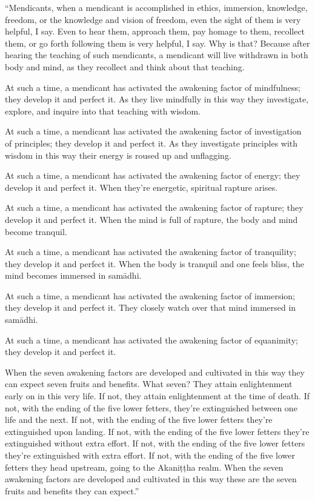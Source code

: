 \documentclass[12pt,openany]{book}%
\begin{document}
“Mendicants, when a mendicant is accomplished in ethics, immersion, knowledge, freedom, or the knowledge and vision of freedom, even the sight of them is very helpful, I say. Even to hear them, approach them, pay homage to them, recollect them, or go forth following them is very helpful, I say. Why is that? Because after hearing the teaching of such mendicants, a mendicant will live withdrawn in both body and mind, as they recollect and think about that teaching. 

At such a time, a mendicant has activated the awakening factor of mindfulness; they develop it and perfect it. As they live mindfully in this way they investigate, explore, and inquire into that teaching with wisdom. 

At such a time, a mendicant has activated the awakening factor of investigation of principles; they develop it and perfect it. As they investigate principles with wisdom in this way their energy is roused up and unflagging. 

At such a time, a mendicant has activated the awakening factor of energy; they develop it and perfect it. When they’re energetic, spiritual rapture arises. 

At such a time, a mendicant has activated the awakening factor of rapture; they develop it and perfect it. When the mind is full of rapture, the body and mind become tranquil. 

At such a time, a mendicant has activated the awakening factor of tranquility; they develop it and perfect it. When the body is tranquil and one feels bliss, the mind becomes immersed in \textsanskrit{samādhi}. 

At such a time, a mendicant has activated the awakening factor of immersion; they develop it and perfect it. They closely watch over that mind immersed in \textsanskrit{samādhi}. 

At such a time, a mendicant has activated the awakening factor of equanimity; they develop it and perfect it. 

When the seven awakening factors are developed and cultivated in this way they can expect seven fruits and benefits. What seven? They attain enlightenment early on in this very life. If not, they attain enlightenment at the time of death. If not, with the ending of the five lower fetters, they’re extinguished between one life and the next. If not, with the ending of the five lower fetters they’re extinguished upon landing. If not, with the ending of the five lower fetters they’re extinguished without extra effort. If not, with the ending of the five lower fetters they’re extinguished with extra effort. If not, with the ending of the five lower fetters they head upstream, going to the \textsanskrit{Akaniṭṭha} realm. When the seven awakening factors are developed and cultivated in this way these are the seven fruits and benefits they can expect.” 
\end{document}
